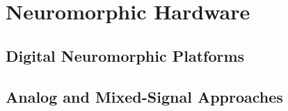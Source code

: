 \section{Neuromorphic Hardware}
\label{sec:hardware}


\subsection{Digital Neuromorphic Platforms}

\subsection{Analog and Mixed-Signal Approaches}

